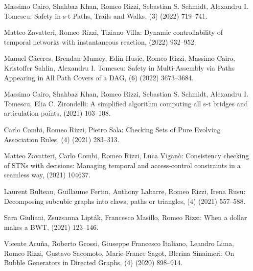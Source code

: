 \begin{etaremune}
  \item {\sc Massimo Cairo, Shahbaz Khan, Romeo Rizzi, Sebastian S. Schmidt, Alexandru I. Tomescu:}
   \newblock Safety in s-t Paths, Trails and Walks,
   (3) (2022) 719--741.

  \item {\sc Matteo Zavatteri, Romeo Rizzi, Tiziano Villa:}
   \newblock Dynamic controllability of temporal networks with instantaneous reaction,
    (2022) 932--952.

  \item {\sc Manuel Cáceres, Brendan Mumey, Edin Husic, Romeo Rizzi, Massimo Cairo, Kristoffer Sahlin, Alexandru I. Tomescu:}
   \newblock Safety in Multi-Assembly via Paths Appearing in All Path Covers of a DAG,
   (6) (2022) 3673--3684.

  \item {\sc Massimo Cairo, Shahbaz Khan, Romeo Rizzi, Sebastian S. Schmidt, Alexandru I. Tomescu, Elia C. Zirondelli:}
   \newblock A simplified algorithm computing all s-t bridges and articulation points,
    (2021) 103--108.

  \item {\sc Carlo Combi, Romeo Rizzi, Pietro Sala:}
   \newblock Checking Sets of Pure Evolving Association Rules,
   (4) (2021) 283--313.

  \item {\sc Matteo Zavatteri, Carlo Combi, Romeo Rizzi, Luca Viganò:}
   \newblock Consistency checking of STNs with decisions: Managing temporal and access-control constraints in a seamless way,
    (2021) 104637.

  \item {\sc Laurent Bulteau, Guillaume Fertin, Anthony Labarre, Romeo Rizzi, Irena Rusu:}
   \newblock Decomposing subcubic graphs into claws, paths or triangles,
   (4) (2021) 557--588.

  \item {\sc Sara Giuliani, Zsuzsanna Lipták, Francesco Masillo, Romeo Rizzi:}
   \newblock When a dollar makes a BWT,
    (2021) 123--146.

  \item {\sc Vicente Acuña, Roberto Grossi, Giuseppe Francesco Italiano, Leandro Lima, Romeo Rizzi, Gustavo Sacomoto, Marie-France Sagot, Blerina Sinaimeri:}
   \newblock On Bubble Generators in Directed Graphs,
   (4) (2020) 898--914.


\end{etaremune}
